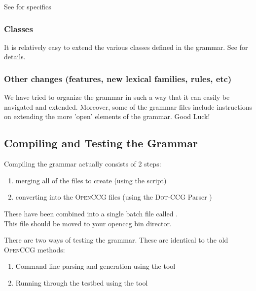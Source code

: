    See  for specifics

\subsubsection{Classes}

It is relatively easy to extend the various classes defined in the grammar. See  for details.
   
\subsubsection{Other changes (features, new lexical families, rules, etc)}

We have tried to organize the grammar in such a way that it can easily be navigated and  extended. Moreover, some of the grammar files include instructions on extending the more 'open' elements of the grammar. Good Luck!

\subsection{Compiling and Testing the Grammar}

Compiling the grammar actually consists of 2 steps:
\begin{enumerate}   
\item merging all of the  files to create   (using the  script)
\item converting  into the \textsc{OpenCCG}  files   (using the \textsc{Dot-CCG} Parser )
\end{enumerate}
These have been combined into a single batch file called . \\
This file should be moved to your openccg bin director. \\

\smallskip

There are two ways of testing the grammar. These are identical to the old \textsc{OpenCCG} methods:
\begin{enumerate}  
\item Command line parsing and generation using the  tool
\item Running through the testbed using the  tool
\end{enumerate}


